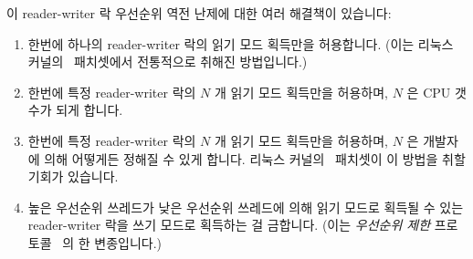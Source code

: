 이 reader-writer 락 우선순위 역전 난제에 대한 여러 해결책이 있습니다:

\begin{enumerate}
\item	한번에 하나의 reader-writer 락의 읽기 모드 획득만을 허용합니다.  (이는
	리눅스 커널의 \rt\ 패치셋에서 전통적으로 취해진 방법입니다.)
\item	한번에 특정 reader-writer 락의 $N$ 개 읽기 모드 획득만을 허용하며, $N$
	은 CPU 갯수가 되게 합니다.
\item	한번에 특정 reader-writer 락의 $N$ 개 읽기 모드 획득만을 허용하며, $N$
	은 개발자에 의해 어떻게든 정해질 수 있게 합니다.
	리눅스 커널의 \rt\ 패치셋이 이 방법을 취할 기회가 있습니다.
\item	높은 우선순위 쓰레드가 낮은 우선순위 쓰레드에 의해 읽기 모드로 획득될
	수 있는 reader-writer 락을 쓰기 모드로 획득하는 걸 금합니다.
	(이는 \emph{우선순위 제한}
	프로토콜~\cite{LuiSha1990PriorityInheritance} 의 한 변종입니다.)

\end{enumerate}

